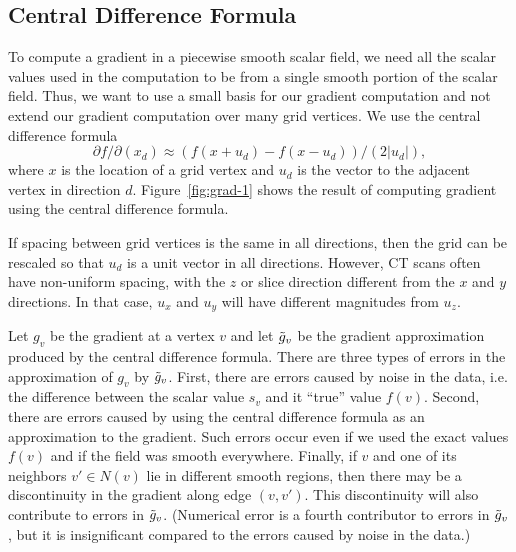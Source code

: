 

\subsection{Central Difference Formula}

To compute a gradient in a piecewise smooth scalar field,
we need all the scalar values used in the computation to be 
from a single smooth portion of the scalar field.
Thus, we want to use a small basis for our gradient computation
and not extend our gradient computation over many grid vertices.
We use the central difference formula
\begin{equation}
\partial f/\partial(x_d) \approx (f(x+u_d) - f(x-u_d))/(2|u_d|),
\label{eqn:cdiff}
\end{equation}
where $x$ is the location of a grid vertex and
$u_d$ is the vector to the adjacent vertex in direction $d$.
Figure~\ref{fig:grad-1} shows the result of computing
gradient using the central difference formula.

If spacing between grid vertices is the same in all directions,
then the grid can be rescaled so that $u_d$ is a unit vector 
in all directions.
However, CT scans often have non-uniform spacing,
with the $z$ or slice direction different from the $x$ and $y$ directions.
In that case, $u_x$ and $u_y$ will have different magnitudes from $u_z$.

Let $g_v$ be the gradient at a vertex $v$
and let $\tilde{g}_v$ be the gradient approximation produced 
by the central difference formula.
There are three types of errors in the approximation of $g_v$ by $\tilde{g}_v$.
First, there are errors caused by noise in the data,
i.e. the difference between the scalar value $s_v$ 
and it ``true'' value $f(v)$.
Second, there are errors caused by using the central difference formula
as an approximation to the gradient.
Such errors occur even if we used the exact values $f(v)$
and if the field was smooth everywhere.
Finally, if $v$ and one of its neighbors $v' \in N(v)$ 
lie in different smooth regions,
then there may be a discontinuity in the gradient along edge $(v,v')$.
This discontinuity will also contribute to errors in $\tilde{g}_v$. (Numerical error is a fourth contributor to errors in $\tilde{g}_v$,
but it is insignificant compared to the errors caused by noise in the data.)

